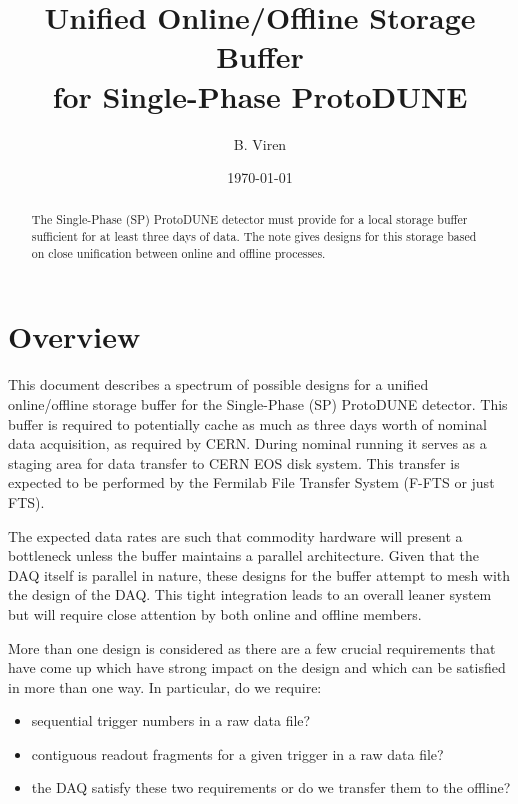 \documentclass[pdftex,12pt,letter]{article}
\title{Unified Online/Offline Storage Buffer\\for Single-Phase ProtoDUNE}
\date{\today}
\author{B. Viren}
\begin{document}
\maketitle

\begin{abstract}
  The Single-Phase (SP) ProtoDUNE detector must provide for a local storage
  buffer sufficient for at least three days of data.  The note gives
  designs for this storage based on close unification between online
  and offline processes.
\end{abstract}


\pagebreak

\section{Overview}

This document describes a spectrum of possible designs for a unified
online/offline storage buffer for the Single-Phase (SP) ProtoDUNE
detector.  This buffer is required to potentially cache as much as
three days worth of nominal data acquisition, as required by CERN.
During nominal running it serves as a staging area for data transfer
to CERN EOS disk system.  This transfer is expected to be performed by
the Fermilab File Transfer System (F-FTS or just FTS).

The expected data rates are such that commodity hardware will present
a bottleneck unless the buffer maintains a parallel architecture.
Given that the DAQ itself is parallel in nature, these designs for the
buffer attempt to mesh with the design of the DAQ.  This tight
integration leads to an overall leaner system but will require close
attention by both online and offline members.

More than one design is considered as there are a few crucial
requirements that have come up which have strong impact on the design
and which can be satisfied in more than one way.  In particular, do we
require:

\begin{itemize}
\item sequential trigger numbers in a raw data file?
\item contiguous readout fragments for a given trigger in a raw data file?
\item the DAQ satisfy these two requirements or do we transfer them to the offline?
\end{itemize}
\end{document}
